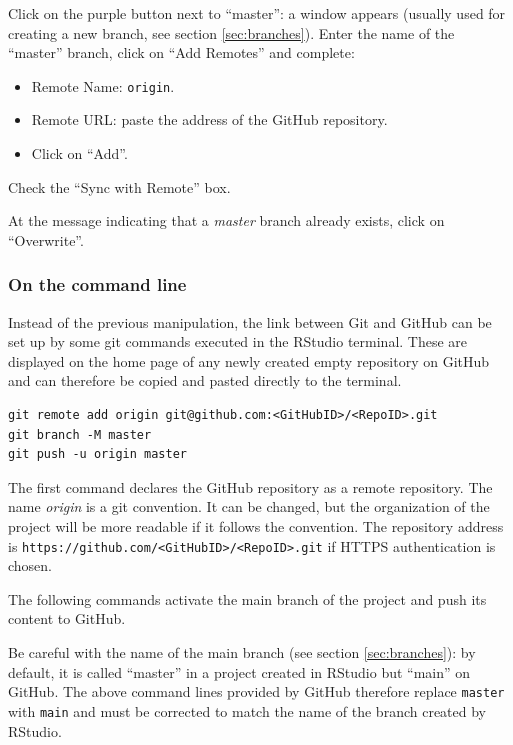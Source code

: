 \documentclass[
  12pt,
  american,
  a4paper,
  extrafontsizes,onecolumn,openright
  ]{memoir}
\providecommand{\tightlist}{%
  \setlength{\itemsep}{0pt}\setlength{\parskip}{0pt}}
\begin{document}
Click on the purple button next to \enquote{master}: a window appears (usually used for creating a new branch, see section \ref{sec:branches}).
Enter the name of the \enquote{master} branch, click on \enquote{Add Remotes} and complete:

\begin{itemize}
\tightlist
\item
  Remote Name: \texttt{origin}.
\item
  Remote URL: paste the address of the GitHub repository.
\item
  Click on \enquote{Add}.
\end{itemize}

Check the \enquote{Sync with Remote} box.

At the message indicating that a \emph{master} branch already exists, click on \enquote{Overwrite}.

\hypertarget{on-the-command-line}{%
\subsubsection{On the command line}\label{on-the-command-line}}

Instead of the previous manipulation, the link between Git and GitHub can be set up by some git commands executed in the RStudio terminal.
These are displayed on the home page of any newly created empty repository on GitHub and can therefore be copied and pasted directly to the terminal.

\begin{verbatim}
git remote add origin git@github.com:<GitHubID>/<RepoID>.git
git branch -M master
git push -u origin master
\end{verbatim}

The first command declares the GitHub repository as a remote repository.
The name \emph{origin} is a git convention.
It can be changed, but the organization of the project will be more readable if it follows the convention.
The repository address is \texttt{https://github.com/\textless{}GitHubID\textgreater{}/\textless{}RepoID\textgreater{}.git} if HTTPS authentication is chosen.

The following commands activate the main branch of the project and push its content to GitHub.

Be careful with the name of the main branch (see section \ref{sec:branches}): by default, it is called \enquote{master} in a project created in RStudio but \enquote{main} on GitHub.
The above command lines provided by GitHub therefore replace \texttt{master} with \texttt{main} and must be corrected to match the name of the branch created by RStudio.
\end{document}
